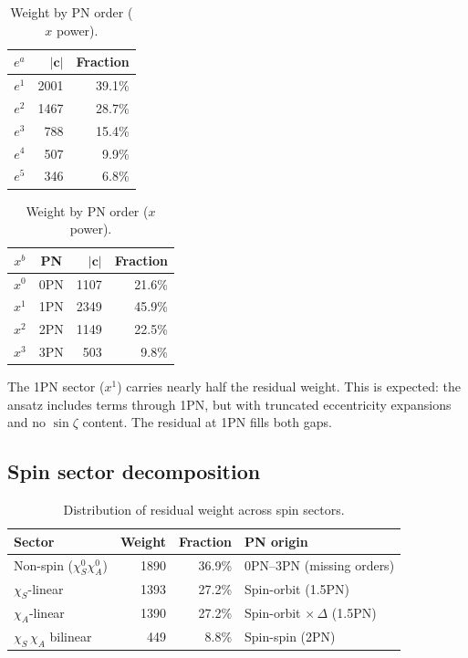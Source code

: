 \documentclass[11pt,letterpaper]{article}
\newcommand{\chiS}{\chi_S}
\newcommand{\chiA}{\chi_A}
\begin{document}
\begin{table}[H]
\centering
\begin{minipage}[t]{0.45\textwidth}
\centering
\caption{Weight by eccentricity power.}
\label{tab:epow}
\begin{tabular}{@{}crr@{}}
\toprule
$e^a$ & $|\mathbf{c}|$ & Fraction \\
\midrule
$e^1$ & 2001 & 39.1\% \\
$e^2$ & 1467 & 28.7\% \\
$e^3$ & 788 & 15.4\% \\
$e^4$ & 507 & 9.9\% \\
$e^5$ & 346 & 6.8\% \\
\bottomrule
\end{tabular}
\end{minipage}
\hfill
\begin{minipage}[t]{0.45\textwidth}
\centering
\caption{Weight by PN order ($x$ power).}
\label{tab:xpow}
\begin{tabular}{@{}ccrr@{}}
\toprule
$x^b$ & PN & $|\mathbf{c}|$ & Fraction \\
\midrule
$x^0$ & 0PN & 1107 & 21.6\% \\
$x^1$ & 1PN & 2349 & 45.9\% \\
$x^2$ & 2PN & 1149 & 22.5\% \\
$x^3$ & 3PN & 503 & 9.8\% \\
\bottomrule
\end{tabular}
\end{minipage}
\end{table}

\noindent The 1PN sector ($x^1$) carries nearly half the residual weight. This is expected: the ansatz includes terms through 1PN, but with truncated eccentricity expansions and no $\sin\zeta$ content. The residual at 1PN fills both gaps.

\subsection{Spin sector decomposition}

\begin{table}[H]
\centering
\caption{Distribution of residual weight across spin sectors.}
\label{tab:spin}
\begin{tabular}{@{}lrrl@{}}
\toprule
Sector & Weight & Fraction & PN origin \\
\midrule
Non-spin ($\chiS^0 \chiA^0$) & 1890 & 36.9\% & 0PN--3PN (missing orders) \\
$\chiS$-linear & 1393 & 27.2\% & Spin-orbit (1.5PN) \\
$\chiA$-linear & 1390 & 27.2\% & Spin-orbit $\times\,\Delta$ (1.5PN) \\
$\chiS\,\chiA$ bilinear & 449 & 8.8\% & Spin-spin (2PN) \\
\bottomrule
\end{tabular}
\end{table}
\end{document}
